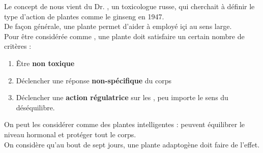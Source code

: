 
\begin{Defi}

    Le concept de  nous vient du Dr. , un toxicologue russe, 
    qui cherchait à définir le type d'action de plantes comme le ginseng en 1947.\\

    De façon générale, une plante  permet d'aider à  employé içi au sens large.\\

    Pour être considérée comme , une plante doit satisfaire un certain nombre de critères :
    \begin{enumerate}
        \item Être \textbf{non toxique}
        \item Déclencher une réponse \textbf{non-spécifique} du corps
        \item Déclencher une \textbf{action régulatrice} sur les , peu importe le sens du déséquilibre.
    \end{enumerate} 
    On peut les considérer comme des plantes intelligentes : peuvent équilibrer le niveau hormonal et protéger tout le corps.\\

    On considère qu'au bout de sept jours, une plante adaptogène doit faire de l'effet. 
    
\end{Defi}

